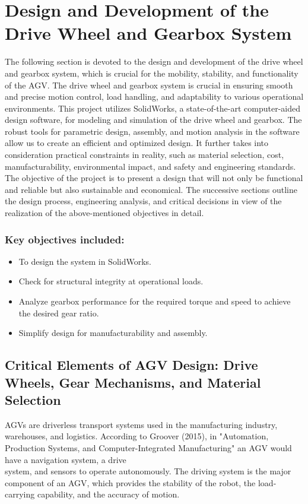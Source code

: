 \documentclass[../../main]{subfiles}
\begin{document}
\chapter{Design and Development of the Drive Wheel and Gearbox System}


The following section is devoted to the design and development of the drive wheel and gearbox system, which is crucial for the mobility, stability, and functionality of the AGV.
The drive wheel and gearbox system is crucial in ensuring smooth and precise motion control, load handling, and adaptability to various operational environments. This project utilizes SolidWorks, a state-of-the-art computer-aided design software, for modeling and simulation of the drive wheel and gearbox. The robust tools for parametric design, assembly, and motion analysis in the software allow us to create an efficient and optimized design. It further takes into consideration practical constraints in reality, such as material selection, cost, manufacturability, environmental impact, and safety and engineering standards.
The objective of the project is to present a design that will not only be functional and reliable but also sustainable and economical. The successive sections outline the design process, engineering analysis, and critical decisions in view of the realization of the above-mentioned objectives in detail.

\subsection*{Key objectives included:}

\begin{itemize}
\item
  To design the system in SolidWorks.
\item
  Check for structural integrity at operational loads.
\item
  Analyze gearbox performance for the required torque and speed to
  achieve the desired gear ratio.
\item
  Simplify design for manufacturability and assembly.
\end{itemize}
\newpage
\section{Critical Elements of AGV Design: Drive Wheels, Gear Mechanisms, and Material Selection}

AGVs are driverless transport systems used in the manufacturing
industry, warehouses, and logistics. According to Groover (2015)\cite{groover2016automation}, in
"Automation, Production Systems, and Computer-Integrated Manufacturing"
an AGV would have a navigation system, a drive \\system, and sensors to
operate autonomously. The driving system is the major component of an
AGV, which provides the stability of the robot, the load-carrying
capability, and the accuracy of motion.
\end{document}
